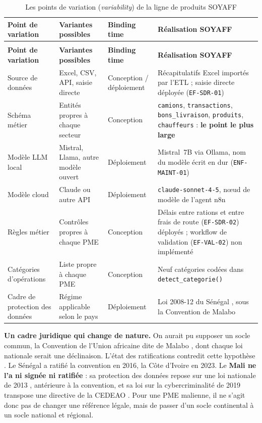 \begin{longtable}{|>{\raggedright\arraybackslash}p{2.5cm}|>{\raggedright\arraybackslash}p{3.7cm}|>{\raggedright\arraybackslash}p{2.0cm}|>{\raggedright\arraybackslash}p{5.5cm}|}
\caption{Les points de variation (\textit{variability}) de la ligne de produits SOYAFF}
\label{tab:variation_points_spl} \\
\hline
\rowcolor[HTML]{EFEFEF}
\textbf{Point de variation} & \textbf{Variantes possibles} & \textbf{Binding time} & \textbf{Réalisation SOYAFF} \\ \hline
\endfirsthead
\multicolumn{4}{c}{\tablename\ \thetable\ (suite)} \\
\hline
\rowcolor[HTML]{EFEFEF}
\textbf{Point de variation} & \textbf{Variantes possibles} & \textbf{Binding time} & \textbf{Réalisation SOYAFF} \\ \hline
\endhead
\hline
\endlastfoot
Source de données & Excel, CSV, API, saisie directe & Conception / déploiement & Récapitulatifs Excel importés par l'ETL ; saisie directe déployée (\texttt{EF-SDR-01}) \\ \hline
Schéma métier & Entités propres à chaque secteur & Conception & \texttt{camions}, \texttt{transactions}, \texttt{bons\_livraison}, \texttt{produits}, \texttt{chauffeurs} : \textbf{le point le plus large} \\ \hline
Modèle LLM local & Mistral, Llama, autre modèle ouvert & Déploiement & Mistral~7B via Ollama, nom du modèle écrit en dur (\texttt{ENF-MAINT-01}) \\ \hline
Modèle cloud & Claude ou autre API & Déploiement & \texttt{claude-sonnet-4-5}, nœud de modèle de l'agent n8n \\ \hline
Règles métier & Contrôles propres à chaque PME & Conception & Délais entre rations et entre frais de route (\texttt{EF-SDR-02}) déployés ; workflow de validation (\texttt{EF-VAL-02}) non implémenté \\ \hline
Catégories d'opérations & Liste propre à chaque PME & Conception & Neuf catégories codées dans \texttt{detect\_categorie()} \\ \hline
Cadre de protection des données & Régime applicable selon le pays & Déploiement & Loi 2008-12 du Sénégal \cite{senegalLoi200812}, sous la Convention de Malabo \cite{uaConventionMalabo2014} \\ \hline
\end{longtable}

\textbf{Un cadre juridique qui change de nature.} On aurait pu supposer un socle commun, la Convention de l'Union africaine dite de Malabo \cite{uaConventionMalabo2014}, dont chaque loi nationale serait une déclinaison. L'état des ratifications contredit cette hypothèse \cite{uaListeRatificationsMalabo2023}. Le Sénégal a ratifié la convention en 2016, la Côte d'Ivoire en 2023. Le \textbf{Mali ne l'a ni signée ni ratifiée} : sa protection des données repose sur une loi nationale de 2013 \cite{maliLoi2013015Protection2013}, antérieure à la convention, et sa loi sur la cybercriminalité de 2019 transpose une directive de la CEDEAO \cite{maliLoi2019056Cybercriminalite2019}. Pour une PME malienne, il ne s'agit donc pas de changer une référence légale, mais de passer d'un socle continental à un socle national et régional.

